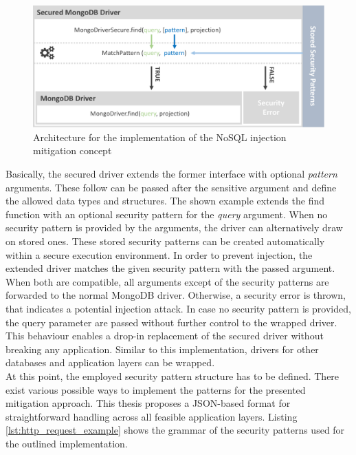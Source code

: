 \begin{figure}[h]
\centering
  \includegraphics[width=1\linewidth]{Images/secure_driver}
  \caption{Architecture for the implementation of the NoSQL injection mitigation concept}
  \label{fig:architecture_secure_driver}
\end{figure}

Basically, the secured driver extends the former interface with optional \emph{pattern} arguments. These follow can be passed after the sensitive argument and define the allowed data types and structures. The shown example extends the find function with an optional security pattern for the \emph{query} argument. When no security pattern is provided by the arguments, the driver can alternatively draw on stored ones. These stored security patterns can be created automatically within a secure execution environment. In order to prevent injection, the extended driver matches the given security pattern with the passed argument. When both are compatible, all arguments except of the security patterns are forwarded to the normal MongoDB driver. Otherwise, a security error is thrown, that indicates a potential injection attack. In case no security pattern is provided, the query parameter are passed without further control to the wrapped driver. This behaviour enables a drop-in replacement of the secured driver without breaking any application. Similar to this implementation, drivers for other databases and application layers can be wrapped. \\

At this point, the employed security pattern structure has to be defined. There exist various possible ways to implement the patterns for the presented mitigation approach. This thesis proposes a JSON-based format for straightforward handling across all feasible application layers. Listing \ref{lst:http_request_example} shows the grammar of the security patterns used for the outlined implementation. \\

